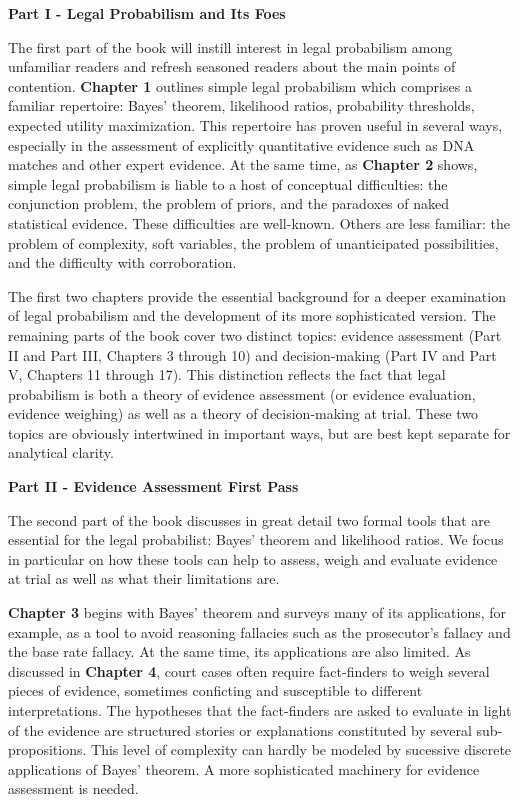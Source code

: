 \documentclass[
  10pt,
  dvipsnames,enabledeprecatedfontcommands]{scrartcl}
\begin{document}
\noindent \textbf{Part I - Legal Probabilism and Its Foes}

\vspace{2mm}

\noindent The first part of the book will instill interest in legal
probabilism among unfamiliar readers and refresh seasoned readers about
the main points of contention. \textbf{Chapter 1} outlines simple legal
probabilism which comprises a familiar repertoire: Bayes' theorem,
likelihood ratios, probability thresholds, expected utility
maximization. This repertoire has proven useful in several ways,
especially in the assessment of explicitly quantitative evidence such as
DNA matches and other expert evidence. At the same time, as
\textbf{Chapter 2} shows, simple legal probabilism is liable to a host
of conceptual difficulties: the conjunction problem, the problem of
priors, and the paradoxes of naked statistical evidence. These
difficulties are well-known. Others are less familiar: the problem of
complexity, soft variables, the problem of unanticipated possibilities,
and the difficulty with corroboration.

The first two chapters provide the essential background for a deeper
examination of legal probabilism and the development of its more
sophisticated version. The remaining parts of the book cover two
distinct topics: evidence assessment (Part II and Part III, Chapters 3
through 10) and decision-making (Part IV and Part V, Chapters 11 through
17). This distinction reflects the fact that legal probabilism is both a
theory of evidence assessment (or evidence evaluation, evidence
weighing) as well as a theory of decision-making at trial. These two
topics are obviously intertwined in important ways, but are best kept
separate for analytical clarity.

\vspace{3mm}

\noindent \textbf{Part II - Evidence Assessment First Pass}

\noindent The second part of the book discusses in great detail two
formal tools that are essential for the legal probabilist: Bayes'
theorem and likelihood ratios. We focus in particular on how these tools
can help to assess, weigh and evaluate evidence at trial as well as what
their limitations are.

\textbf{Chapter 3} begins with Bayes' theorem and surveys many of its
applications, for example, as a tool to avoid reasoning fallacies such
as the prosecutor's fallacy and the base rate fallacy. At the same time,
its applications are also limited. As discussed in \textbf{Chapter 4},
court cases often require fact-finders to weigh several pieces of
evidence, sometimes conficting and susceptible to different
interpretations. The hypotheses that the fact-finders are asked to
evaluate in light of the evidence are structured stories or explanations
constituted by several sub-propositions. This level of complexity can
hardly be modeled by sucessive discrete applications of Bayes' theorem.
A more sophisticated machinery for evidence assessment is needed.
\end{document}
